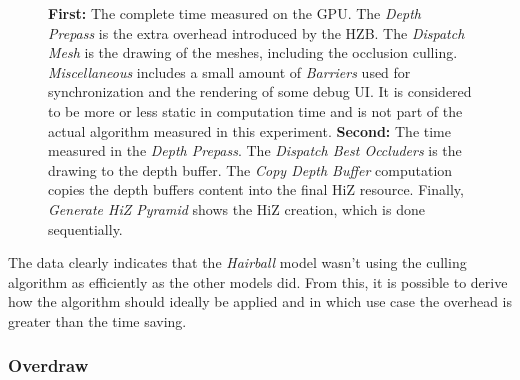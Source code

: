 \begin{figure}[!htb]
  \caption{\textbf{First:} The complete time measured on the \ac{GPU}. The \emph{Depth Prepass} is the extra 
  overhead introduced by the \ac{HZB}. The \emph{Dispatch Mesh} is the drawing of the meshes, including the 
  occlusion culling. \emph{Miscellaneous} includes a small amount of \emph{Barriers} used for synchronization 
  and the rendering of some debug \ac{UI}. It is considered to be more or less static in computation time and 
  is not part of the actual algorithm measured in this experiment. \textbf{Second:} The time measured in the 
  \emph{Depth Prepass}. The \emph{Dispatch Best Occluders} is the drawing to the depth buffer. The 
  \emph{Copy Depth Buffer} computation copies the depth buffers content into the final \ac{HiZ} resource. 
  Finally, \emph{Generate HiZ Pyramid} shows the \ac{HiZ} creation, which is done sequentially.}
  \label{fig:hairball-gpu-times}
\end{figure}

\noindent
The data clearly indicates that the \emph{Hairball} model wasn't using the culling algorithm as efficiently as 
the other models did. From this, it is possible to derive how the algorithm should ideally be applied and in 
which use case the overhead is greater than the time saving.

\subsubsection*{Overdraw}

